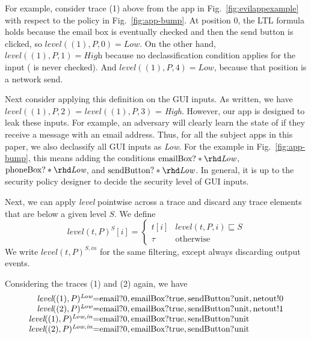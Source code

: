 \documentclass{entcs} \usepackage{entcsmacro}
\newcommand{\code}[1]{\text{\lstinline!#1!}}
\newcommand{\tr}{t\xspace}
\newcommand{\tlevel}[3]{\textit{level}(#1, #2, #3)}
\newcommand{\tleveltr}[2]{\textit{level}(#1, #2)}
\begin{document}
For example, consider trace (1) above from the app in
Fig.~\ref{fig:evilappexample} with respect to the policy in
Fig.~\ref{fig:app-bump}.  At position 0, the LTL formula holds because
the email box is eventually checked and then the send button is
clicked, so $\tlevel{(1)}{P}{0} = \textit{Low}$. On the other hand,
$\tlevel{(1)}{P}{1} = \textit{High}$ because no declassification
condition applies for the \code{phone} input (\code{phoneBox} is never
checked). And $\tlevel{(1)}{P}{4} = \textit{Low}$, because that
position is a network send.

Next consider applying this definition on the GUI inputs. As written,
we have $\tlevel{(1)}{P}{2}$ = $\tlevel{(1)}{P}{3}$ =
\textit{High}. However, our app is designed to leak these inputs. 
For example, an adversary will clearly learn the state of
\code{emailBox} if they receive a message with an email address. Thus,
for all the subject apps in this paper, we also declassify all GUI inputs as
\textit{Low}. 
For the example in Fig.~\ref{fig:app-bump}, this means
adding the conditions
$\code{emailBox?}\ast \rhd \textit{Low}$,
$\code{phoneBox?}\ast \rhd \textit{Low}$, and
$\code{sendButton?}\ast \rhd \textit{Low}$. In general, it is up to
the security policy designer to decide the security level of GUI inputs.

Next, we can apply \textit{level} pointwise across a trace and discard
any trace elements that are below a given level $S$. We define
\begin{displaymath}
\tleveltr{\tr}{P}^S[i] =
\begin{cases}
\tr[i] & \tlevel{\tr}{P}{i} \sqsubseteq S \\
\tau & \textrm{otherwise}
\end{cases}
\end{displaymath}
We write $\tleveltr{\tr}{P}^{S,in}$ for the same filtering, except
always discarding output events.

Considering the traces (1) and (2) again, we have
\begin{displaymath}
  \begin{array}{r@{ }c@{ }l}
    \tleveltr{(1)}{P}^\textit{Low} & = & \code{email}?0, \code{emailBox}?\code{true},
    \code{sendButton}?\code{unit}, \code{netout}!0 \\
    \tleveltr{(2)}{P}^\textit{Low} & = & \code{email}?0, \code{emailBox}?\code{true},
    \code{sendButton}?\code{unit}, \code{netout}!1 \\
    \tleveltr{(1)}{P}^\textit{Low,in} & = & \code{email}?0, \code{emailBox}?\code{true},
    \code{sendButton}?\code{unit} \\
    \tleveltr{(2)}{P}^\textit{Low,in} & = & \code{email}?0, \code{emailBox}?\code{true},
    \code{sendButton}?\code{unit} \\
  \end{array}
\end{displaymath}
\end{document}
